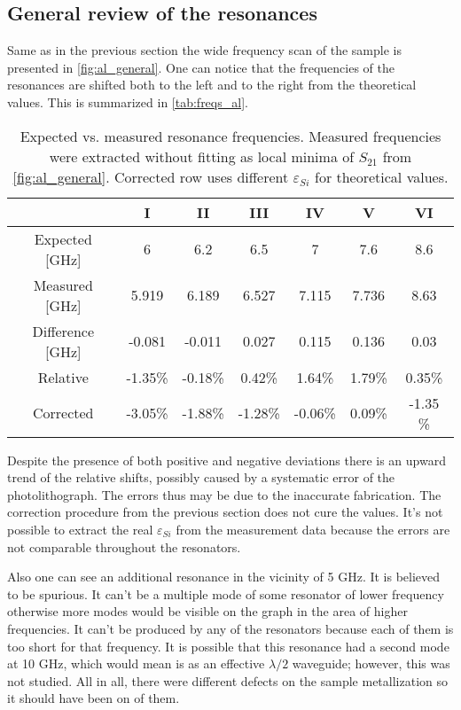\documentclass[12pt]{article}
\numberwithin{equation}{section}
\numberwithin{figure}{section}
\begin{document}
\subsection{General review of the resonances}

Same as in the previous section the wide frequency scan of the sample is presented in \autoref{fig:al_general}. One can notice that the frequencies of the resonances are shifted  both to the left and to the right from the theoretical values. This is summarized in \autoref{tab:freqs_al}.

\begin{table}
\centering
\bgroup
\def\arraystretch{1.5}%
\begin{tabular}{c|*{6}{c}}
  & I & II & III & IV & V & VI\\
\hline
Expected [GHz]& 6 & 6.2 & 6.5 & 7 & 7.6 & 8.6 \\
Measured [GHz] & 5.919 & 6.189 & 6.527 & 7.115 & 7.736 & 8.63 \\
Difference [GHz]&  -0.081 & -0.011 &  0.027 &  0.115 &  0.136 &  0.03 \\
Relative & -1.35\% & -0.18\% &  0.42\% &  1.64\% &  1.79\% &  0.35\%\\
Corrected & -3.05\% & -1.88\% & -1.28\% & -0.06\% &  0.09\% & -1.35 \%
\end{tabular}
\egroup
\caption{Expected vs. measured resonance frequencies. Measured frequencies were extracted without fitting as local minima of $S_{21}$ from \autoref{fig:al_general}. Corrected row uses different $\varepsilon_{Si}$ for theoretical values.}
\label{tab:freqs_al}
\end{table}

Despite the presence of both positive and negative deviations there is an upward trend of the relative shifts, possibly caused by a systematic error of the photolithograph. The errors thus may be due to the inaccurate fabrication. The correction procedure from the previous section does not cure the values. It's not possible to extract the real $\varepsilon_{Si}$ from the measurement data because the errors are not comparable throughout the resonators.

Also one can see an additional resonance in the vicinity of 5 GHz. It is believed to be spurious. It can't be a multiple mode of some resonator of lower frequency otherwise more modes would be visible on the graph in the area of higher frequencies. It can't be produced by any of the resonators because each of them is too short for that frequency. It is possible that this resonance had a second mode at 10 GHz, which would mean is as an effective $\lambda/2$ waveguide; however, this was not studied. All in all, there were different defects on the sample metallization so it should have been on of them.
\end{document}
